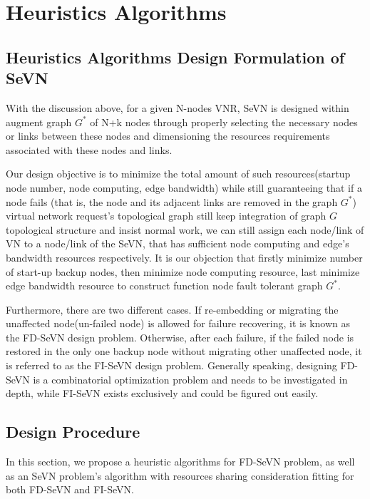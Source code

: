 ﻿\section{Heuristics Algorithms}
\subsection{Heuristics Algorithms Design Formulation of SeVN }
\label{sub:SeVNDesignFormulation}
With the discussion above, for a given N-nodes VNR, SeVN is designed within augment graph $G^*$ of N+k nodes through properly selecting the necessary nodes or links between these nodes and dimensioning the resources requirements associated with these nodes and links.

Our design objective is to minimize the total amount of such resources(startup node number, node computing, edge bandwidth) while still guaranteeing that if a node fails (that is, the node and its adjacent links are removed in the graph $G^*$) virtual network request's topological graph still keep integration of graph $G$ topological structure and insist normal work, we can still assign each node/link of VN to a node/link of the SeVN, that has sufficient node computing and edge's bandwidth resources respectively. It is our objection that firstly minimize number of start-up backup nodes, then minimize node computing resource, last minimize edge bandwidth resource to construct function node fault tolerant graph $G^*$.

Furthermore, there are two different cases. If re-embedding or migrating the unaffected node(un-failed node) is allowed for failure recovering, it is known as the FD-SeVN design problem. Otherwise, after each failure, if the failed node is restored in the only one backup node without migrating other unaffected node, it is referred to as the FI-SeVN design problem. Generally speaking, designing FD-SeVN is a combinatorial optimization problem and needs to be investigated in depth, while FI-SeVN exists exclusively and could be figured out easily.


\subsection{Design Procedure}

In this section, we propose a heuristic algorithms for FD-SeVN problem, as well as an SeVN problem's algorithm with resources sharing consideration fitting for both FD-SeVN and FI-SeVN.

